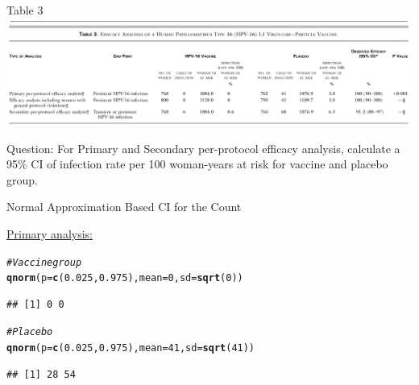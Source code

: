 \documentclass[10pt]{beamer}\usepackage[]{graphicx}\usepackage[]{color}
\makeatletter
\newcommand{\hlnum}[1]{\textcolor[rgb]{0.686,0.059,0.569}{#1}}%
\newcommand{\hlcom}[1]{\textcolor[rgb]{0.678,0.584,0.686}{\textit{#1}}}%
\newcommand{\hlstd}[1]{\textcolor[rgb]{0.345,0.345,0.345}{#1}}%
\newcommand{\hlkwc}[1]{\textcolor[rgb]{0.333,0.667,0.333}{#1}}%
\newcommand{\hlkwd}[1]{\textcolor[rgb]{0.737,0.353,0.396}{\textbf{#1}}}%
\newenvironment{kframe}{%
 \def\at@end@of@kframe{}%
 \ifinner\ifhmode%
  \def\at@end@of@kframe{\end{minipage}}%
  \begin{minipage}{\columnwidth}%
 \fi\fi%
 \def\FrameCommand##1{\hskip\@totalleftmargin \hskip-\fboxsep
 \colorbox{shadecolor}{##1}\hskip-\fboxsep
     \hskip-\linewidth \hskip-\@totalleftmargin \hskip\columnwidth}%
 \MakeFramed {\advance\hsize-\width
   \@totalleftmargin\z@ \linewidth\hsize
   \@setminipage}}%
 {\par\unskip\endMakeFramed%
 \at@end@of@kframe}
\newenvironment{knitrout}{}{} %
\makeatother
\begin{document}
\begin{frame}{Table 3}
	\includegraphics[scale=0.3]{nejm_tab3.png}
	
	\vspace{0.5in}
	\alert{Question}: For Primary and Secondary per-protocol efficacy analysis, calculate a 95\% CI of infection rate per 100 woman-years at risk for vaccine and placebo group.
	
\end{frame}


\begin{frame}[fragile]{Normal Approximation Based CI for the Count}
	
	\underline{Primary analysis:}
	\vspace{0.1in}
\begin{knitrout}\tiny
{}\color{fgcolor}\begin{kframe}
\begin{alltt}
\hlcom{# Vaccine group}
\hlkwd{qnorm}\hlstd{(}\hlkwc{p} \hlstd{=} \hlkwd{c}\hlstd{(}\hlnum{0.025}\hlstd{,} \hlnum{0.975}\hlstd{),} \hlkwc{mean} \hlstd{=} \hlnum{0}\hlstd{,} \hlkwc{sd} \hlstd{=} \hlkwd{sqrt}\hlstd{(}\hlnum{0}\hlstd{))}
\end{alltt}
\begin{verbatim}
## [1] 0 0
\end{verbatim}
\begin{alltt}
\hlcom{# Placebo}
\hlkwd{qnorm}\hlstd{(}\hlkwc{p} \hlstd{=} \hlkwd{c}\hlstd{(}\hlnum{0.025}\hlstd{,} \hlnum{0.975}\hlstd{),} \hlkwc{mean} \hlstd{=} \hlnum{41}\hlstd{,} \hlkwc{sd} \hlstd{=} \hlkwd{sqrt}\hlstd{(}\hlnum{41}\hlstd{))}
\end{alltt}
\begin{verbatim}
## [1] 28 54
\end{verbatim}
\end{kframe}
\end{knitrout}
	
\end{frame}
\end{document}
